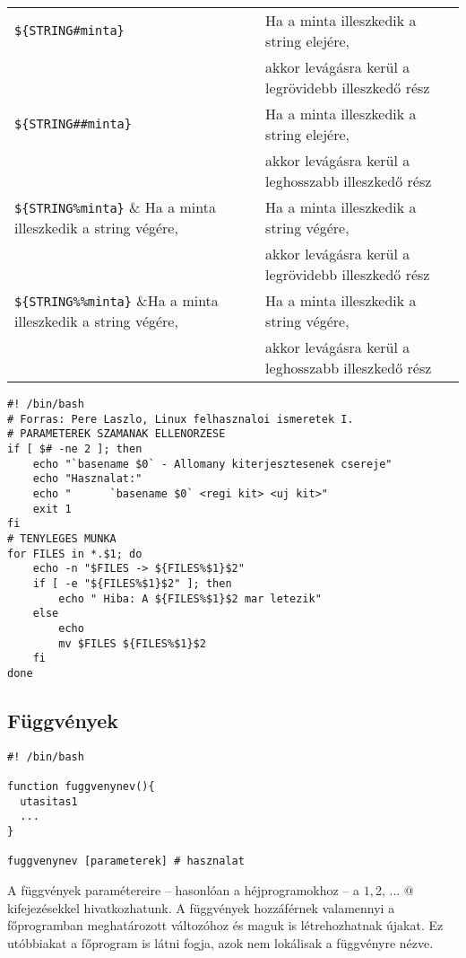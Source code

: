 \begin{center}
 \begin{tabular}{|ll|}
\hline
\verb.${STRING#minta}.	& Ha a minta illeszkedik a string elejére, \\
			&  akkor levágásra kerül a legrövidebb illeszkedő rész
\\
\hline
\verb.${STRING##minta}.	& Ha a minta illeszkedik a string elejére, \\
			&  akkor levágásra kerül a leghosszabb illeszkedő rész
\\
\hline
\verb.${STRING%minta}. 	& Ha a minta illeszkedik a string végére, \\
			&  akkor levágásra kerül a legrövidebb illeszkedő rész
\\
\hline
\verb.${STRING%%minta}.	&Ha a minta illeszkedik a string végére,\\
			&	akkor levágásra kerül a leghosszabb illeszkedő rész
\\
\hline  
 \end{tabular}
\end{center}
\begin{lstlisting}[title=scriptek/bash/vago.sh]
#! /bin/bash
# Forras: Pere Laszlo, Linux felhasznaloi ismeretek I.
# PARAMETEREK SZAMANAK ELLENORZESE
if [ $# -ne 2 ]; then
	echo "`basename $0` - Allomany kiterjesztesenek csereje"
	echo "Hasznalat:"
	echo "		`basename $0` <regi kit> <uj kit>"
	exit 1
fi
# TENYLEGES MUNKA
for FILES in *.$1; do
	echo -n "$FILES -> ${FILES%$1}$2"
	if [ -e "${FILES%$1}$2" ]; then		
		echo " Hiba: A ${FILES%$1}$2 mar letezik"
	else
		echo
		mv $FILES ${FILES%$1}$2
	fi
done
\end{lstlisting}


\subsection{Függvények}

\begin{lstlisting}
#! /bin/bash

function fuggvenynev(){
  utasitas1
  ...
}

fuggvenynev [parameterek] # hasznalat
\end{lstlisting}

A függvények paramétereire -- hasonlóan a héjprogramokhoz -- a \verb@$1, $2, ... @ kifejezésekkel hivat\-koz\-ha\-tunk.
A függvények hozzáférnek valamennyi a főprogramban meghatározott változóhoz és maguk is lét\-re\-hoz\-hat\-nak újakat. 
Ez utóbbiakat a főprogram is látni fogja, azok nem lokálisak a függvényre nézve. 


